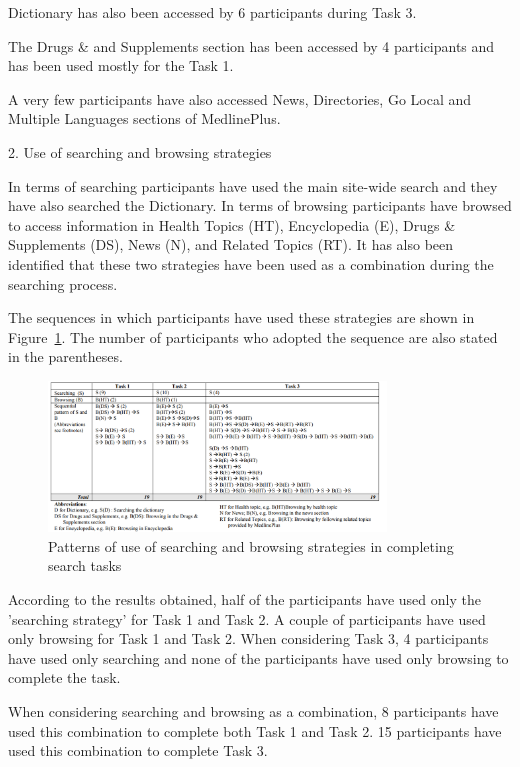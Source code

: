 \documentclass[]{article}
\begin{document}
Dictionary has also been accessed by 6 participants during Task 3.  

The Drugs \& and Supplements section has been accessed by 4 participants and has been used mostly for the Task 1. 

A very few participants have also accessed News, Directories, Go Local and Multiple Languages
sections of MedlinePlus.     

2. Use of searching and browsing strategies

In terms of searching participants have used the main site-wide search and they have also searched the Dictionary. In terms of browsing participants have browsed to access information in Health Topics (HT), Encyclopedia (E), Drugs \& Supplements (DS), News (N), and Related Topics (RT). It has also been identified that these two strategies have been used as a combination during the searching process.  
   
The sequences in which participants have used these strategies are shown in Figure~\ref{fig22}. The number of participants who adopted the sequence are also stated in the parentheses. 

\begin{figure}[t!]
	\includegraphics[width=0.8\textwidth]{Capture22.png}
	\caption{ Patterns of use of searching and browsing strategies in completing search tasks  \label{fig22}}
\end{figure} 

According to the results obtained, half of the participants have used only the 'searching strategy' for Task 1 and Task 2. A couple of participants have used only browsing for Task 1 and Task 2. When considering Task 3, 4 participants have used only searching and none of the participants have used only browsing to complete the task. 

When considering searching and browsing as a combination, 8 participants have used this combination to complete both Task 1 and Task 2. 15 participants have used this combination to complete Task 3.  
\end{document}

